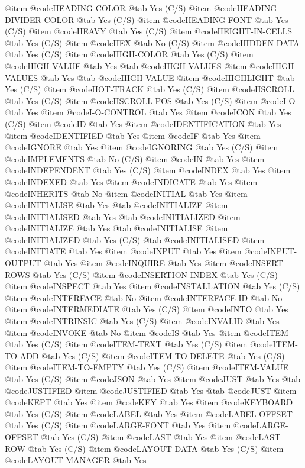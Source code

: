 @item @code{HEADING-COLOR} @tab Yes (C/S)
@item @code{HEADING-DIVIDER-COLOR} @tab Yes (C/S)
@item @code{HEADING-FONT} @tab Yes (C/S)
@item @code{HEAVY} @tab Yes (C/S)
@item @code{HEIGHT-IN-CELLS} @tab Yes (C/S)
@item @code{HEX} @tab No (C/S)
@item @code{HIDDEN-DATA} @tab Yes (C/S)
@item @code{HIGH-COLOR} @tab Yes (C/S)
@item @code{HIGH-VALUE} @tab Yes @tab @code{HIGH-VALUES}
@item @code{HIGH-VALUES} @tab Yes @tab @code{HIGH-VALUE}
@item @code{HIGHLIGHT} @tab Yes (C/S)
@item @code{HOT-TRACK} @tab Yes (C/S)
@item @code{HSCROLL} @tab Yes (C/S)
@item @code{HSCROLL-POS} @tab Yes (C/S)
@item @code{I-O} @tab Yes
@item @code{I-O-CONTROL} @tab Yes
@item @code{ICON} @tab Yes (C/S)
@item @code{ID} @tab Yes
@item @code{IDENTIFICATION} @tab Yes
@item @code{IDENTIFIED} @tab Yes
@item @code{IF} @tab Yes
@item @code{IGNORE} @tab Yes
@item @code{IGNORING} @tab Yes (C/S)
@item @code{IMPLEMENTS} @tab No (C/S)
@item @code{IN} @tab Yes
@item @code{INDEPENDENT} @tab Yes (C/S)
@item @code{INDEX} @tab Yes
@item @code{INDEXED} @tab Yes
@item @code{INDICATE} @tab Yes
@item @code{INHERITS} @tab No
@item @code{INITIAL} @tab Yes
@item @code{INITIALISE} @tab Yes @tab @code{INITIALIZE}
@item @code{INITIALISED} @tab Yes @tab @code{INITIALIZED}
@item @code{INITIALIZE} @tab Yes @tab @code{INITIALISE}
@item @code{INITIALIZED} @tab Yes (C/S) @tab @code{INITIALISED}
@item @code{INITIATE} @tab Yes
@item @code{INPUT} @tab Yes
@item @code{INPUT-OUTPUT} @tab Yes
@item @code{INQUIRE} @tab Yes
@item @code{INSERT-ROWS} @tab Yes (C/S)
@item @code{INSERTION-INDEX} @tab Yes (C/S)
@item @code{INSPECT} @tab Yes
@item @code{INSTALLATION} @tab Yes (C/S)
@item @code{INTERFACE} @tab No
@item @code{INTERFACE-ID} @tab No
@item @code{INTERMEDIATE} @tab Yes (C/S)
@item @code{INTO} @tab Yes
@item @code{INTRINSIC} @tab Yes (C/S)
@item @code{INVALID} @tab Yes
@item @code{INVOKE} @tab No
@item @code{IS} @tab Yes
@item @code{ITEM} @tab Yes (C/S)
@item @code{ITEM-TEXT} @tab Yes (C/S)
@item @code{ITEM-TO-ADD} @tab Yes (C/S)
@item @code{ITEM-TO-DELETE} @tab Yes (C/S)
@item @code{ITEM-TO-EMPTY} @tab Yes (C/S)
@item @code{ITEM-VALUE} @tab Yes (C/S)
@item @code{JSON} @tab Yes
@item @code{JUST} @tab Yes @tab @code{JUSTIFIED}
@item @code{JUSTIFIED} @tab Yes @tab @code{JUST}
@item @code{KEPT} @tab Yes
@item @code{KEY} @tab Yes
@item @code{KEYBOARD} @tab Yes (C/S)
@item @code{LABEL} @tab Yes
@item @code{LABEL-OFFSET} @tab Yes (C/S)
@item @code{LARGE-FONT} @tab Yes
@item @code{LARGE-OFFSET} @tab Yes (C/S)
@item @code{LAST} @tab Yes
@item @code{LAST-ROW} @tab Yes (C/S)
@item @code{LAYOUT-DATA} @tab Yes (C/S)
@item @code{LAYOUT-MANAGER} @tab Yes
